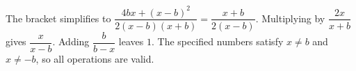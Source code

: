 The bracket simplifies to $\dfrac{4bx+(x-b)^2}{2(x-b)(x+b)}=\dfrac{x+b}{2(x-b)}$. Multiplying by $\dfrac{2x}{x+b}$ gives $\dfrac{x}{x-b}$. Adding $\dfrac{b}{b-x}$ leaves $\boxed1$. The specified numbers satisfy $x\ne b$ and $x\ne-b$, so all operations are valid.
